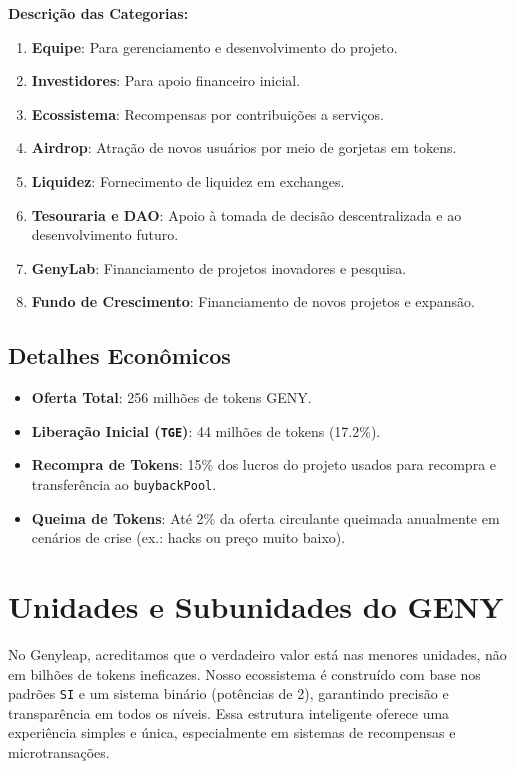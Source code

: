 \documentclass[a4paper,12pt,openany]{book}
\begin{document}
\textbf{Descrição das Categorias:}
\begin{enumerate}
    \item \textbf{Equipe}: Para gerenciamento e desenvolvimento do projeto.
    \item \textbf{Investidores}: Para apoio financeiro inicial.
    \item \textbf{Ecossistema}: Recompensas por contribuições a serviços.
    \item \textbf{Airdrop}: Atração de novos usuários por meio de gorjetas em tokens.
    \item \textbf{Liquidez}: Fornecimento de liquidez em exchanges.
    \item \textbf{Tesouraria e DAO}: Apoio à tomada de decisão descentralizada e ao desenvolvimento futuro.
    \item \textbf{GenyLab}: Financiamento de projetos inovadores e pesquisa.
    \item \textbf{Fundo de Crescimento}: Financiamento de novos projetos e expansão.
\end{enumerate}

\subsection*{Detalhes Econômicos}
\begin{itemize}
    \item \textbf{Oferta Total}: 256 milhões de tokens GENY.
    \item \textbf{Liberação Inicial (\texttt{TGE})}: 44 milhões de tokens (17.2\%).
    \item \textbf{Recompra de Tokens}: 15\% dos lucros do projeto usados para recompra e transferência ao \texttt{buybackPool}.
    \item \textbf{Queima de Tokens}: Até 2\% da oferta circulante queimada anualmente em cenários de crise (ex.: hacks ou preço muito baixo).
\end{itemize}
\newpage

\section*{Unidades e Subunidades do GENY}
No Genyleap, acreditamos que o verdadeiro valor está nas menores unidades, não em bilhões de tokens ineficazes. Nosso ecossistema é construído com base nos padrões \texttt{SI} e um sistema binário (potências de 2), garantindo precisão e transparência em todos os níveis. Essa estrutura inteligente oferece uma experiência simples e única, especialmente em sistemas de recompensas e microtransações.
\end{document}
